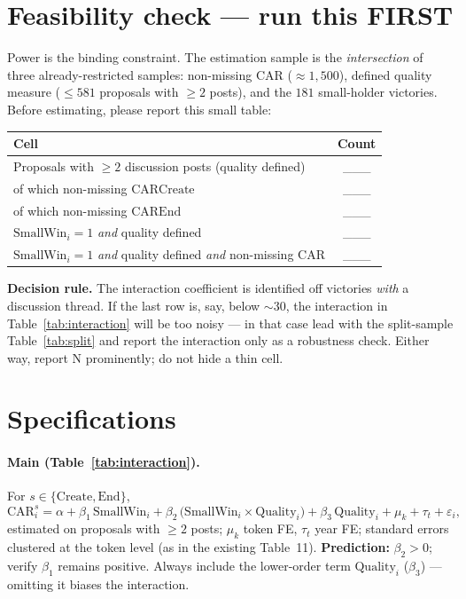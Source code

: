 \documentclass[11pt]{article}
\newcommand{\SmallWin}{\mathrm{SmallWin}}
\begin{document}
\clearpage
\section{Feasibility check --- run this FIRST}
\label{sec:feasibility}

Power is the binding constraint. The estimation sample is the \emph{intersection} of
three already-restricted samples: non-missing CAR ($\approx 1{,}500$), defined quality
measure ($\le 581$ proposals with $\ge 2$ posts), and the $181$ small-holder victories.
Before estimating, please report this small table:

\begin{center}
\begin{tabular}{lc}
\toprule
Cell & Count \\
\midrule
Proposals with $\ge 2$ discussion posts (quality defined) & \_\_\_ \\
\quad of which non-missing $\mathrm{CARCreate}$ & \_\_\_ \\
\quad of which non-missing $\mathrm{CAREnd}$ & \_\_\_ \\
$\SmallWin_i = 1$ \emph{and} quality defined & \_\_\_ \\
$\SmallWin_i = 1$ \emph{and} quality defined \emph{and} non-missing CAR & \_\_\_ \\
\bottomrule
\end{tabular}
\end{center}

\noindent\textbf{Decision rule.} The interaction coefficient is identified off victories
\emph{with} a discussion thread. If the last row is, say, below $\sim 30$, the
interaction in Table~\ref{tab:interaction} will be too noisy --- in that case lead with
the split-sample Table~\ref{tab:split} and report the interaction only as a robustness
check. Either way, report N prominently; do not hide a thin cell.

\section{Specifications}

\paragraph{Main (Table~\ref{tab:interaction}).} For $s \in \{\text{Create},\text{End}\}$,
\[
\mathrm{CAR}^{s}_i = \alpha + \beta_1\,\SmallWin_i
   + \beta_2\,\bigl(\SmallWin_i \times \mathrm{Quality}_i\bigr)
   + \beta_3\,\mathrm{Quality}_i
   + \mu_k + \tau_t + \varepsilon_i ,
\]
estimated on proposals with $\ge 2$ posts; $\mu_k$ token FE, $\tau_t$ year FE; standard
errors clustered at the token level (as in the existing Table~11). \textbf{Prediction:}
$\beta_2 > 0$; verify $\beta_1$ remains positive. Always include the lower-order term
$\mathrm{Quality}_i$ ($\beta_3$) --- omitting it biases the interaction.
\end{document}
